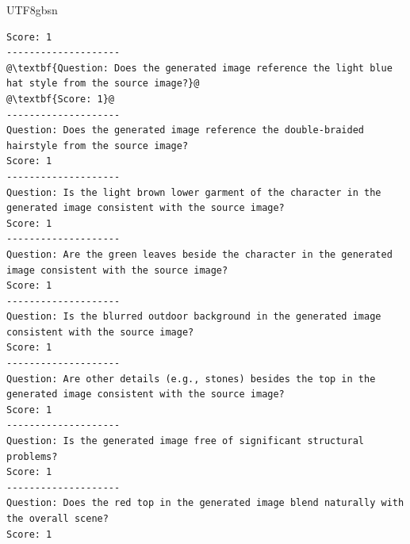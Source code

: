 \documentclass{llmxive}
\begin{document}
\begin{CJK*}{UTF8}{gbsn}
\begin{lstlisting}
Score: 1
--------------------
@\textbf{Question: Does the generated image reference the light blue hat style from the source image?}@
@\textbf{Score: 1}@
--------------------
Question: Does the generated image reference the double-braided hairstyle from the source image?
Score: 1
--------------------
Question: Is the light brown lower garment of the character in the generated image consistent with the source image?
Score: 1
--------------------
Question: Are the green leaves beside the character in the generated image consistent with the source image?
Score: 1
--------------------
Question: Is the blurred outdoor background in the generated image consistent with the source image?
Score: 1
--------------------
Question: Are other details (e.g., stones) besides the top in the generated image consistent with the source image?
Score: 1
--------------------
Question: Is the generated image free of significant structural problems?
Score: 1
--------------------
Question: Does the red top in the generated image blend naturally with the overall scene?
Score: 1
\end{lstlisting}

\end{CJK*}
\end{document}
